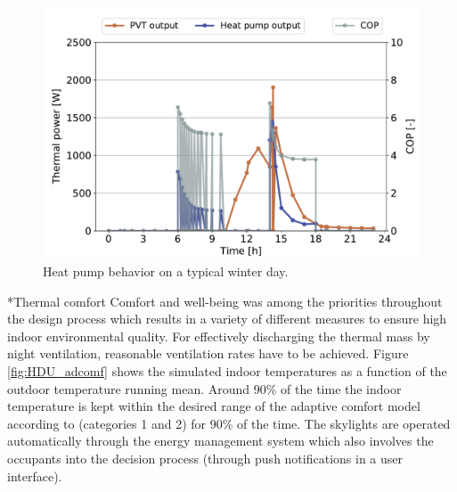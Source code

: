 \documentclass[twocolumn, a4paper,10pt]{article}
\makeatletter
\renewcommand\subsection{\@startsection{subsection}{1}{\z@}{\z@}{\z@}{\normalfont\normalsize\bfseries}}
\renewcommand\subsection{\@startsection{subsection}{1}{\z@}{\z@}{0.1pt}{\normalfont\normalsize\bfseries}}
\makeatother
\begin{document}
\begin{figure}[H]
\centering
\includegraphics[scale=0.34]{img/HDU_HPop.pdf}
\caption{Heat pump behavior on a typical winter day.}
\label{fig:HDU_HPop}
\end{figure}

\subsection*{Thermal comfort}
Comfort and well-being was among the priorities throughout the design process which results in a variety of different measures to ensure high indoor environmental quality. For effectively discharging the thermal mass by night ventilation, reasonable ventilation rates have to be achieved. Figure \ref{fig:HDU_adcomf} shows the simulated indoor temperatures as a function of the outdoor temperature running mean. Around 90\% of the time the indoor temperature is kept within the desired range of the adaptive comfort model according to \citet{DIN16798} (categories 1 and 2) for 90\% of the time. The skylights are operated automatically through the energy management system which also involves the occupants into the decision process (through push notifications in a user interface). 
\end{document}
